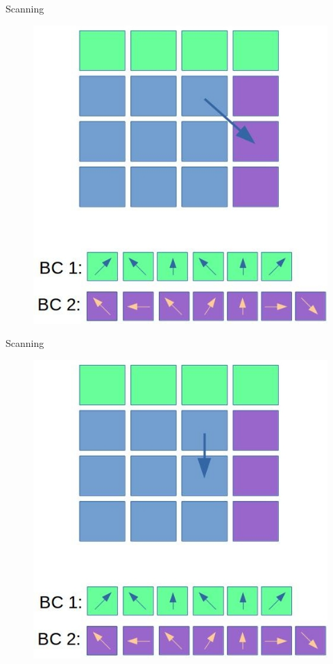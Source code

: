 \documentclass[9pt]{beamer}
\begin{document}
\begin{frame}[t]{Scanning}
\begin{figure}
\includegraphics[scale=0.3]{images/scan-7.jpg}
\centering
\end{figure}
\end{frame}

\begin{frame}[t]{Scanning}
\begin{figure}
\includegraphics[scale=0.3]{images/scan-8.jpg}
\centering
\end{figure}
\end{frame}
\end{document}
